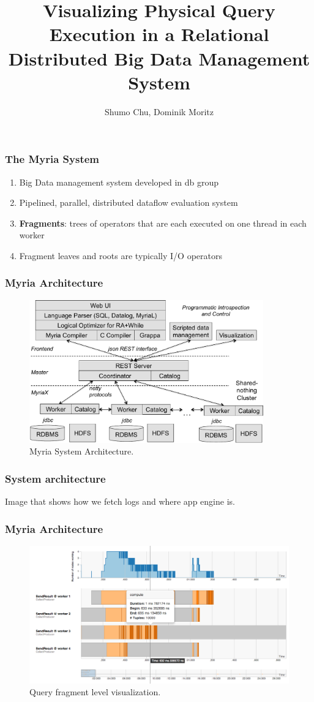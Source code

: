 \documentclass[xetex,mathserif,serif]{beamer}
\title[Query Visualization] %
{Visualizing Physical Query Execution in a Relational Distributed Big Data Management System}
\subtitle{}
\author[Chu, moritz] %
{Shumo Chu, Dominik Moritz}
\begin{document}
\begin{frame}
\titlepage

\end{frame}

\begin{frame}
\frametitle{The Myria System}
\begin{enumerate}
	\item Big Data management system developed in db group
	\item Pipelined, parallel, distributed dataflow evaluation system
	\item \textbf{Fragments}: trees of operators that are each executed on one thread in each worker
	\item Fragment leaves and roots are typically I/O operators
\end{enumerate}
\end{frame}

\begin{frame}
\frametitle{Myria Architecture}
\begin{figure}
 \begin{center}
     \includegraphics[width=0.9\textwidth]{arch}
   \end{center}
  \caption{Myria System Architecture.}
  \label{fig:myria_arc}
\end{figure}
\end{frame}

\begin{frame}
\frametitle{System architecture}
Image that shows how we fetch logs and where app engine is.
\end{frame}

\begin{frame}
\frametitle{Myria Architecture}
\begin{figure}
 \begin{center}
     \includegraphics[width=\textwidth]{figure1}
   \end{center}
  \caption{Query fragment level visualization.}
\end{figure}
\end{frame}
\end{document}
